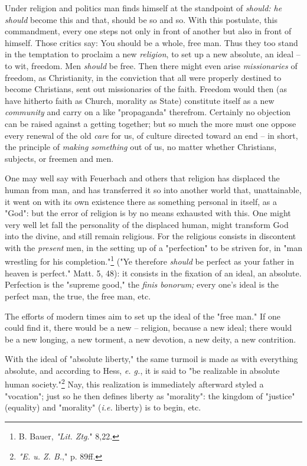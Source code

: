Under religion and politics man finds himself at the standpoint of 
\textit{should: he should} become this and that, should be so and so. With 
this postulate, this commandment, every one steps not only in front of another 
but also in front of himself. Those critics say: You should be a whole, free 
man. Thus they too stand in the temptation to proclaim a new 
\textit{religion}, to set up a new absolute, an ideal -- to wit, freedom. Men 
\textit{should} be free. Then there might even arise \textit{missionaries} of 
freedom, as Christianity, in the conviction that all were properly destined to 
become Christians, sent out missionaries of the faith. Freedom would then (as 
have hitherto faith as Church, morality as State) constitute itself as a new 
\textit{community} and carry on a like "{}propaganda"{} therefrom. Certainly 
no objection can be raised against a getting together; but so much the more 
must one oppose every renewal of the old \textit{care} for us, of culture 
directed toward an end -- in short, the principle of \textit{making something} 
out of us, no matter whether Christians, subjects, or freemen and men.

One may well say with Feuerbach and others that religion has displaced the 
human from man, and has transferred it so into another world that, 
unattainable, it went on with its own existence there as something personal in 
itself, as a "{}God"{}: but the error of religion is by no means exhausted 
with this. One might very well let fall the personality of the displaced 
human, might transform God into the divine, and still remain religious. For 
the religious consists in discontent with the \textit{present} men, in the 
setting up of a "{}perfection"{} to be striven for, in "{}man wrestling for 
his completion."{}\footnote{B. Bauer, \textit{"{}Lit. Ztg}."{} 8,22.} ("{}Ye 
therefore \textit{should} be perfect as your father in heaven is perfect."{} 
Matt. 5, 48): it consists in the fixation of an ideal, an absolute. Perfection 
is the "{}supreme good,"{} the \textit{finis bonorum;} every one's ideal is 
the perfect man, the true, the free man, etc.

The efforts of modern times aim to set up the ideal of the "{}free man."{} If 
one could find it, there would be a new -- religion, because a new ideal; 
there would be a new longing, a new torment, a new devotion, a new deity, a 
new contrition.

With the ideal of "{}absolute liberty,"{} the same turmoil is made as with 
everything absolute, and according to Hess, \textit{e. g.}, it is said to 
"{}be realizable in absolute human society."{}\footnote{\textit{"{}E. u. Z. 
B.},"{} p. 89ff.} Nay, this realization is immediately afterward styled a 
"{}vocation"{}; just so he then defines liberty as "{}morality"{}: the kingdom 
of "{}justice"{} (equality) and "{}morality"{} (\textit{i.e.} liberty) is to 
begin, etc.

